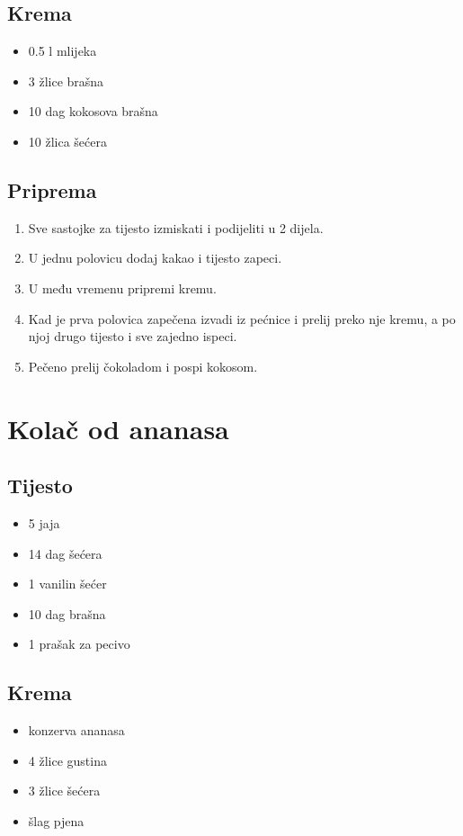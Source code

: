 \documentclass{article}
\begin{document}
\subsection{Krema}
\begin{itemize}
  \item 0.5 l mlijeka
  \item 3 žlice brašna
  \item 10 dag kokosova brašna
  \item 10 žlica šećera
\end{itemize}

\subsection{Priprema}
\begin{enumerate}
  \item Sve sastojke za tijesto izmiskati i podijeliti u 2 dijela.
  \item U jednu polovicu dodaj kakao i tijesto zapeci.
  \item U među vremenu pripremi kremu.
  \item Kad je prva polovica zapečena izvadi iz pećnice i prelij preko nje kremu, a po njoj drugo tijesto i sve zajedno ispeci.
  \item Pečeno prelij čokoladom i pospi kokosom.
\end{enumerate}


\section{Kolač od ananasa}
\subsection{Tijesto}
\begin{itemize}
  \item 5 jaja
  \item 14 dag šećera
  \item 1 vanilin šećer
  \item 10 dag brašna
  \item 1 prašak za pecivo
\end{itemize}

\subsection{Krema}
\begin{itemize}
  \item konzerva ananasa
  \item 4 žlice gustina
  \item 3 žlice šećera
  \item šlag pjena
\end{itemize}
\end{document}
